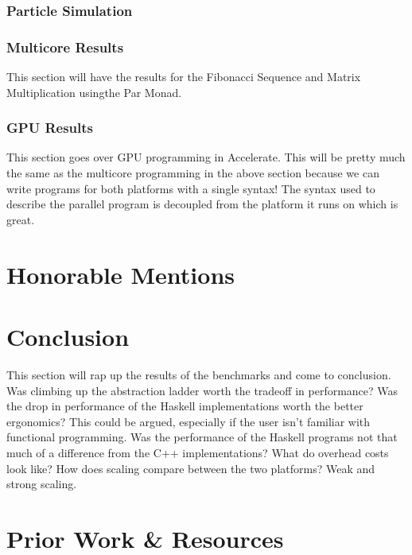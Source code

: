 \documentclass[a4paper, 10pt]{article}
\begin{document}
\subsubsection{Particle Simulation}

\subsubsection{Multicore Results}
This section will have the results for the Fibonacci Sequence and Matrix Multiplication usingthe Par Monad.

\subsubsection{GPU Results}
This section goes over GPU programming in Accelerate. This will be pretty much the same
as the multicore programming in the above section because we can write programs for both platforms
with a single syntax! The syntax used to describe the parallel program is decoupled from the platform it runs on which is great.

\section{Honorable Mentions}


\section{Conclusion}
This section will rap up the results of the benchmarks and come to conclusion. Was climbing up the
 abstraction ladder worth the tradeoff in performance? Was the drop in performance of the Haskell implementations
 worth the better ergonomics? This could be argued, especially if the user isn't familiar with functional programming.
 Was the performance of the Haskell programs not that much of a difference from the C++ implementations? What do overhead costs look like?
 How does scaling compare between the two platforms? Weak and strong scaling.

\section{Prior Work \& Resources}
\end{document}
